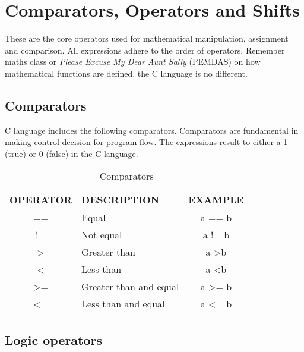 \section{Comparators, Operators and Shifts}

These are the core operators used for mathematical manipulation, assignment and comparison. All expressions adhere to the order of operators. Remember maths class or \textit{Please Excuse My Dear Aunt Sally} (PEMDAS) on how mathematical functions are defined, the C language is no different.

\subsection{Comparators} \label{comparisons}

C language includes the following comparators. Comparators are fundamental in making control decision for program flow. The expressions result to either a 1 (true) or 0 (false) in the C language.



\begin{table*}[ht]
\centering
  \begin{tabular}{ | c | l | c |} 
    \hline
    OPERATOR & DESCRIPTION & EXAMPLE \\ \hline
    == & Equal & a == b  \\ \hline
    != & Not equal & a != b  \\ \hline
    \textgreater & Greater than & a \textgreater b \\ \hline
    \textless & Less than & a \textless b \\ \hline
    \textgreater= & Greater than and equal & a \textgreater= b \\ \hline
    \textless= & Less than and equal & a \textless= b \\ \hline
  \end{tabular}
\caption{Comparators}
\label{table:comparators}
\end{table*}

\subsection{Logic operators}

